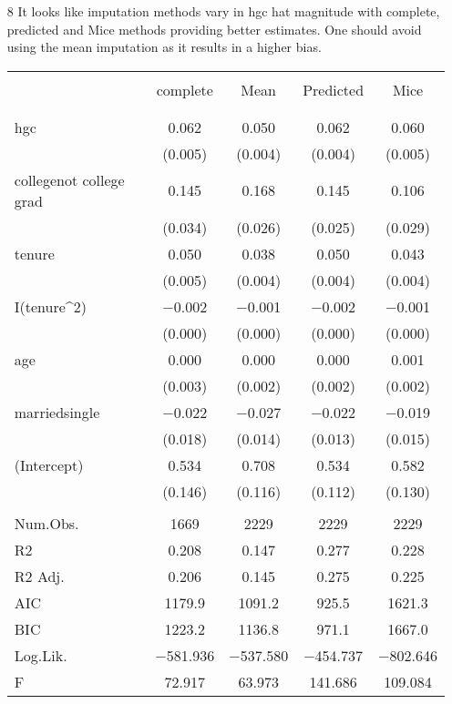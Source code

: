 \documentclass[12pt]{article}
\theoremstyle{definition}
\begin{document}
\begin{enumerate}

\item[8]  
It looks like imputation methods vary in hgc hat magnitude with complete, predicted and Mice methods providing better estimates. One should avoid using the mean imputation as it results in a higher bias. 

\begin{table}
\centering
\begin{tabular}[h!]{lcccc} 
\hline  \\[-1.2ex]
  & complete & Mean & Predicted & Mice\\ \\[-1.2ex]
\hline \\[-1.2ex]
hgc & \num{0.062} & \num{0.050} & \num{0.062} & \num{0.060}\\
 & (\num{0.005}) & (\num{0.004}) & (\num{0.004}) & (\num{0.005})\\
collegenot college grad & \num{0.145} & \num{0.168} & \num{0.145} & \num{0.106}\\
 & (\num{0.034}) & (\num{0.026}) & (\num{0.025}) & (\num{0.029})\\
tenure & \num{0.050} & \num{0.038} & \num{0.050} & \num{0.043}\\
 & (\num{0.005}) & (\num{0.004}) & (\num{0.004}) & (\num{0.004})\\
I(tenure\textasciicircum2) & \num{-0.002} & \num{-0.001} & \num{-0.002} & \num{-0.001}\\
 & (\num{0.000}) & (\num{0.000}) & (\num{0.000}) & (\num{0.000})\\
age & \num{0.000} & \num{0.000} & \num{0.000} & \num{0.001}\\
 & (\num{0.003}) & (\num{0.002}) & (\num{0.002}) & (\num{0.002})\\
marriedsingle & \num{-0.022} & \num{-0.027} & \num{-0.022} & \num{-0.019}\\
 & (\num{0.018}) & (\num{0.014}) & (\num{0.013}) & (\num{0.015})\\
 (Intercept) & \num{0.534} & \num{0.708} & \num{0.534} & \num{0.582}\\
 & (\num{0.146}) & (\num{0.116}) & (\num{0.112}) & (\num{0.130})\\
\midrule  \\[-1.2ex] 
Num.Obs. & \num{1669} & \num{2229} & \num{2229} & \num{2229}\\
R2 & \num{0.208} & \num{0.147} & \num{0.277} & \num{0.228}\\
R2 Adj. & \num{0.206} & \num{0.145} & \num{0.275} & \num{0.225}\\
AIC & \num{1179.9} & \num{1091.2} & \num{925.5} & \num{1621.3}\\
BIC & \num{1223.2} & \num{1136.8} & \num{971.1} & \num{1667.0}\\
Log.Lik. & \num{-581.936} & \num{-537.580} & \num{-454.737} & \num{-802.646}\\
F & \num{72.917} & \num{63.973} & \num{141.686} & \num{109.084}\\
\hline
\end{tabular}
\end{table}


\end{enumerate}
\end{document}
